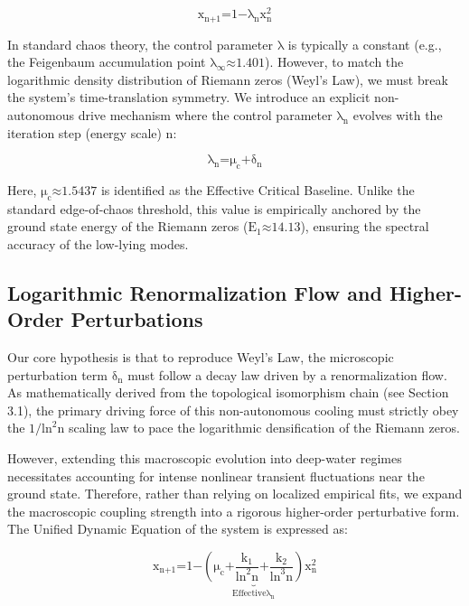 \[\text{x}_{\text{n}\text{+1}}\text{=1−}\text{λ}_{\text{n}}\text{x}_{\text{n}}^{\text{2}}\]

In standard chaos theory, the control parameter \(\text{λ}\) is
typically a constant (e.g., the Feigenbaum accumulation point
\(\text{λ}_{\text{∞}}\text{≈1.401}\)). However, to match the logarithmic
density distribution of Riemann zeros (Weyl's Law), we must break the
system's time-translation symmetry. We introduce an explicit
non-autonomous drive mechanism where the control parameter
\(\text{λ}_{\text{n}}\) evolves with the iteration step (energy scale)
\(\text{n}\):

\[\text{λ}_{\text{n}}\text{=}\text{μ}_{\text{c}}\text{+}\text{δ}_{\text{n}}\]

Here, \(\text{μ}_{\text{c}}\text{≈1.5437}\) is identified as the
Effective Critical Baseline. Unlike the standard edge-of-chaos
threshold, this value is empirically anchored by the ground state energy
of the Riemann zeros (\(\text{E}_{\text{1}}\text{≈14.13}\)), ensuring
the spectral accuracy of the low-lying modes.

\subsection*{Logarithmic Renormalization Flow and Higher-Order Perturbations}

Our core hypothesis is that to reproduce Weyl's Law, the microscopic
perturbation term \(\text{δ}_{\text{n}}\) must follow a decay law driven
by a renormalization flow. As mathematically derived from the
topological isomorphism chain (see Section 3.1), the primary driving
force of this non-autonomous cooling must strictly obey the
\(\text{1/}\text{ln}^{\text{2}}\text{n}\) scaling law to pace the
logarithmic densification of the Riemann zeros.

However, extending this macroscopic evolution into deep-water regimes
necessitates accounting for intense nonlinear transient fluctuations
near the ground state. Therefore, rather than relying on localized
empirical fits, we expand the macroscopic coupling strength into a
rigorous higher-order perturbative form. The Unified Dynamic Equation of
the system is expressed as:

\[\text{x}_{\text{n}\text{+1}}\text{=1−}\underset{\text{Effective}\text{λ}_{\text{n}}}{\underset{\text{⏟}}{\left( \text{μ}_{\text{c}}\text{+}\frac{\text{k}_{\text{1}}}{\text{ln}^{\text{2}}\text{n}}\text{+}\frac{\text{k}_{\text{2}}}{\text{ln}^{\text{3}}\text{n}} \right)}}\text{x}_{\text{n}}^{\text{2}}\]

